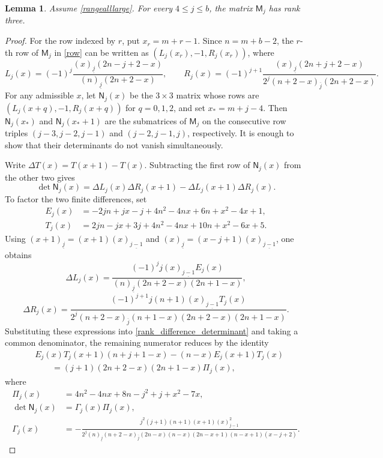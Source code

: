 \documentclass[12pt]{article}
\newtheorem{lemma}{Lemma}[section]
\theoremstyle{remark}
\newcommand{\fall}[2]{(#1)_{\underline{#2}}}
\newcommand{\rise}[2]{(#1)_{\overline{#2}}}
\begin{document}
\begin{lemma}\label{rank}
Assume \eqref{rangealllarge}.  For every $4\le j\le b$, the matrix
$\mathsf M_j$ has rank three.
\end{lemma}
\begin{proof}
For the row indexed by $r$, put $x_r=m+r-1$.  Since $n=m+b-2$, the
$r$-th row of $\mathsf M_j$ in \eqref{row} can be written as
$(L_j(x_r),-1,R_j(x_r))$, where
\[
 L_j(x)=(-1)^j\frac{\fall{x}{j}(2n-j+2-x)}
 {\fall{n}{j}(2n+2-x)},\qquad
 R_j(x)=(-1)^{j+1}\frac{\fall{x}{j}(2n+j+2-x)}
 {2^j\rise{n+2-x}{j}(2n+2-x)}.
\]
For any admissible $x$, let $\mathsf N_j(x)$ be the $3\times3$ matrix
whose rows are $(L_j(x+q),-1,R_j(x+q))$ for $q=0,1,2$, and set
$x_*=m+j-4$.  Then $\mathsf N_j(x_*)$ and $\mathsf N_j(x_*+1)$ are the submatrices of $\mathsf M_j$ on the
consecutive row triples $(j-3,j-2,j-1)$ and $(j-2,j-1,j)$,
respectively.  It is enough to show that their determinants do not
vanish simultaneously.

Write $\Delta T(x)=T(x+1)-T(x)$.  Subtracting the first row of
$\mathsf N_j(x)$ from the other two gives
\begin{equation}\label{rank_difference_determinant}
 \det \mathsf N_j(x)=
 \Delta L_j(x)\Delta R_j(x+1)
 -\Delta L_j(x+1)\Delta R_j(x).
\end{equation}
To factor the two finite differences, set
\[
\begin{aligned}
 E_j(x)&=-2jn+jx-j+4n^2-4nx+6n+x^2-4x+1,\\
 T_j(x)&= 2jn-jx+3j+4n^2-4nx+10n+x^2-6x+5.
\end{aligned}
\]
Using
$\fall{x+1}{j}=(x+1)\fall{x}{j-1}$ and
$\fall{x}{j}=(x-j+1)\fall{x}{j-1}$, one obtains
\[
 \Delta L_j(x)=
 \frac{(-1)^j j\fall{x}{j-1}E_j(x)}
 {\fall{n}{j}(2n+2-x)(2n+1-x)},
\]
\[
 \Delta R_j(x)=
 \frac{(-1)^{j+1}j(n+1)\fall{x}{j-1}T_j(x)}
 {2^j\rise{n+2-x}{j}(n+1-x)(2n+2-x)(2n+1-x)}.
\]
Substituting these expressions into
\eqref{rank_difference_determinant} and taking a common denominator,
the remaining numerator reduces by the identity
\[
\begin{split}
&E_j(x)T_j(x+1)(n+j+1-x)
 -(n-x)E_j(x+1)T_j(x)\\
&\qquad=(j+1)(2n+2-x)(2n+1-x)\Pi_j(x),
\end{split}
\]
where
\begin{equation}\label{detfactor}
\begin{aligned}
 \Pi_j(x)&=4n^2-4nx+8n-j^2+j+x^2-7x,\\
 \det \mathsf N_j(x)&=\Gamma_j(x)\Pi_j(x),\\
 \Gamma_j(x)&=
 -\frac{j^2(j+1)(n+1)(x+1)\fall{x}{j-1}^{2}}
 {2^j\fall{n}{j}\rise{n+2-x}{j}
 (2n-x)(n-x)(2n-x+1)(n-x+1)(x-j+2)}.
\end{aligned}
\end{equation}


\end{proof}
\end{document}

